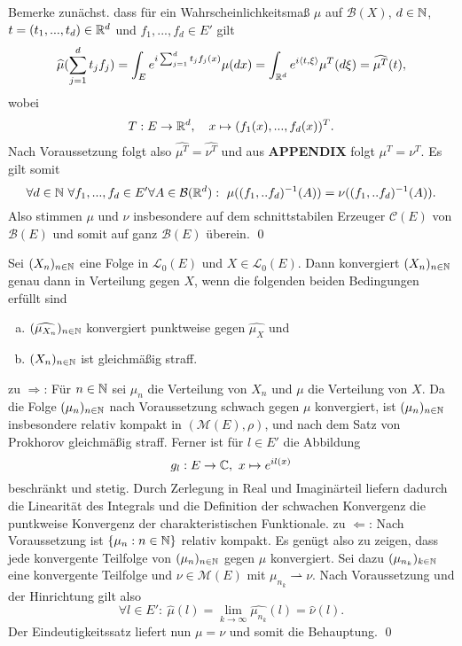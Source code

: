 \begin{proof*}
    Bemerke zunächst. dass für ein Wahrscheinlichkeitsmaß $\mu$ auf $\mathcal{B}(X)$, $d \in  \mathbb{N}$, $t=(t_1,...,t_d) \in \mathbb{R}^d$ und $f_1,..., f_d \in E'$ gilt
    $$
        \widehat{\mu}(\sum_{j=1}^d t_j f_j) = \int_E e^{i\sum_{j=1}^dt_jf_j(x)}\mu(dx) = \int_{\mathbb{R}^d} e^{i\langle t, \xi \rangle}\mu^T(d\xi) = \widehat{\mu^T}(t),
    $$
    wobei 
    $$
        T: E \to \mathbb{R}^d, \quad x \mapsto (f_1(x),...,f_d(x))^T. 
    $$
    Nach Voraussetzung folgt also $\widehat{\mu^T} = \widehat{\nu^T}$ und aus \textbf{APPENDIX} folgt $\mu^T = \nu^T$. 
    Es gilt somit
    $$
        \forall d\in \N \ \forall f_1,...,f_d \in E' \forall A \in \mathcal{B}(\R^d): \ \mu((f_1,..f_d)^{-1}(A)) =  \nu((f_1,..f_d)^{-1}(A)). 
    $$
    Also stimmen $\mu$ und $\nu$ insbesondere auf dem schnittstabilen Erzeuger $\mathcal{C}(E)$ von $\mathcal{B}(E)$ und somit auf ganz $\mathcal{B}(E)$ überein. \qed
\end{proof*}

\begin{theorem}
    Sei $(X_n)_{n \in \mathbb{N}}$ eine Folge in $\mathcal{L}_0(E)$ und $X \in \mathcal{L}_0(E)$. 
    Dann konvergiert $(X_n)_{n \in \mathbb{N}}$ genau dann in Verteilung gegen $X$, wenn die folgenden beiden Bedingungen erfüllt sind
    \begin{enumerate}[(a)]
        \item $(\widehat{\mu_{X_n}})_{n \in \mathbb{N}}$ konvergiert punktweise gegen $\widehat{\mu_X}$ und
        \item $(X_n)_{n \in \mathbb{N}}$ ist gleichmäßig straff. 
    \end{enumerate}
\end{theorem}

\begin{proof*}
    zu $\Rightarrow$: Für $n \in \mathbb{N}$ sei $\mu_n$ die Verteilung von $X_n$ und $\mu$ die Verteilung von $X$. Da die Folge $(\mu_n)_{n \in \mathbb{N}}$ nach Voraussetzung schwach gegen $\mu$ konvergiert, 
    ist $(\mu_n)_{n \in  \mathbb{N}}$ insbesondere relativ kompakt in $(\mathcal{M}(E), \rho)$, und nach dem Satz von Prokhorov gleichmäßig straff. 
    Ferner ist für $l \in E'$ die Abbildung 
    $$
        g_l: E \to \mathbb{C},  \ x \mapsto e^{il(x)}
    $$ 
    beschränkt und stetig. Durch Zerlegung in Real und Imaginärteil liefern dadurch die Linearität des Integrals und die Definition der schwachen Konvergenz die puntkweise Konvergenz der charakteristischen Funktionale. 
    \newline 
    zu $\Leftarrow$: Nach Voraussetzung ist  $\{\mu_n : n \in \mathbb{N}\}$ relativ kompakt. Es genügt also zu zeigen, dass jede konvergente Teilfolge von $(\mu_n)_{n \in \mathbb{N}}$ gegen $\mu$ konvergiert. 
    Sei dazu $(\mu_{n_k})_{k \in \mathbb{N}}$ eine konvergente Teilfolge und $\nu \in \mathcal{M}(E)$ mit $\mu_{n_k} \rightharpoonup \nu$. Nach Voraussetzung und der Hinrichtung gilt also 
    $$
        \forall l \in E': \ \widehat{\mu}(l) = \lim_{k \to \infty} \widehat{\mu_{n_k}}(l) = \widehat{\nu}(l).
    $$
    Der Eindeutigkeitssatz liefert nun $\mu = \nu$ und somit die Behauptung. \qed
\end{proof*}

